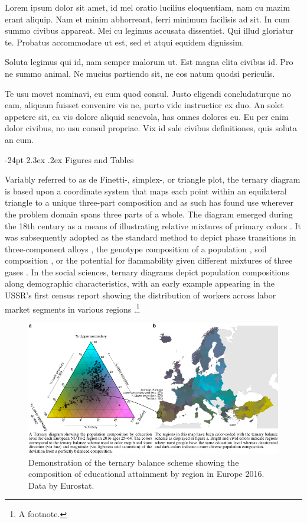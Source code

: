 \documentclass[10pt,twoside,reqno]{article}
\makeatletter
\def\cnstmaxfigwidth{
      \ifdim \Gin@nat@width>\linewidth
        \linewidth
      \else \Gin@nat@width
      \fi
    }
\let\Oldincludegraphics\includegraphics
\renewcommand{\includegraphics}[1]{\Oldincludegraphics[width=\cnstmaxfigwidth]{#1}}
\renewcommand\section{\@startsection {section}{1}{\z@}%
                                   {-24pt}%
                                   {2.3ex \@plus.2ex}%
                                   {\normalfont\large\bfseries}}
\makeatother
\begin{document}
Lorem ipsum dolor sit amet, id mel oratio lucilius eloquentiam, nam cu mazim erant aliquip. Nam et minim abhorreant, ferri minimum facilisis ad sit. In cum summo civibus appareat. Mei cu legimus accusata dissentiet. Qui illud gloriatur te. Probatus accommodare ut est, sed et atqui equidem dignissim.

Soluta legimus qui id, nam semper malorum ut. Est magna clita civibus id. Pro ne summo animal. Ne mucius partiendo sit, ne eos natum quodsi periculis.

Te usu movet nominavi, eu eum quod consul. Justo eligendi concludaturque no eam, aliquam fuisset convenire vis ne, purto vide instructior ex duo. An solet appetere sit, ea vis dolore aliquid scaevola, has omnes dolores eu. Eu per enim dolor civibus, no usu consul propriae. Vix id sale civibus definitiones, quis soluta an eum.

\hypertarget{figures-and-tables}{%
\section{Figures and Tables}\label{figures-and-tables}}

Variably referred to as de Finetti-, simplex-, or triangle plot, the ternary diagram is based upon a coordinate system that maps each point within an equilateral triangle to a unique three-part composition and as such has found use wherever the problem domain spans three parts of a whole. The diagram emerged during the 18th century as a means of illustrating relative mixtures of primary colors \citep{Howarth1996}. It was subsequently adopted as the standard method to depict phase transitions in three-component alloys \citep{Bancroft1897}, the genotype composition of a population \citep{DeFinetti1926}, soil composition \citep{Davis1927}, or the potential for flammability given different mixtures of three gases \citep{Zabetakis1965}. In the social sciences, ternary diagrams depict population compositions along demographic characteristics, with an early example appearing in the USSR's first census report showing the distribution of workers across labor market segments in various regions \citep{Kvitkin1932}.\footnote{A footnote.}

\begin{figure}
\centering
\includegraphics{figure1.pdf}
\caption{\label{fig:unnamed-chunk-2}Demonstration of the ternary balance scheme showing the composition of educational attainment by region in Europe 2016. Data by Eurostat.}
\end{figure}
\end{document}
